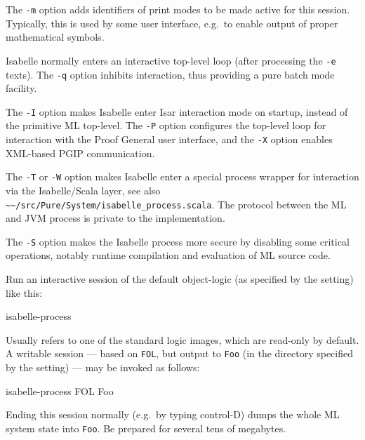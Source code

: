 \begin{isabellebody}
\begin{isamarkuptext}
  \medskip The \verb|-m| option adds identifiers of print modes
  to be made active for this session. Typically, this is used by some
  user interface, e.g.\ to enable output of proper mathematical
  symbols.

  \medskip Isabelle normally enters an interactive top-level loop
  (after processing the \verb|-e| texts). The \verb|-q|
  option inhibits interaction, thus providing a pure batch mode
  facility.

  \medskip The \verb|-I| option makes Isabelle enter Isar
  interaction mode on startup, instead of the primitive ML top-level.
  The \verb|-P| option configures the top-level loop for
  interaction with the Proof General user interface, and the
  \verb|-X| option enables XML-based PGIP communication.

  \medskip The \verb|-T| or \verb|-W| option makes
  Isabelle enter a special process wrapper for interaction via the
  Isabelle/Scala layer, see also \verb|~~/src/Pure/System/isabelle_process.scala|.  The protocol between
  the ML and JVM process is private to the implementation.

  \medskip The \verb|-S| option makes the Isabelle process more
  secure by disabling some critical operations, notably runtime
  compilation and evaluation of ML source code.%
\end{isamarkuptext}%
\isamarkuptrue%
%
\isamarkuptrue%
%
\begin{isamarkuptext}%
Run an interactive session of the default object-logic (as specified
  by the \hyperlink{setting.ISABELLE-LOGIC}{\mbox{}} setting) like this:
\begin{ttbox}
isabelle-process
\end{ttbox}

  Usually \hyperlink{setting.ISABELLE-LOGIC}{\mbox{}} refers to one of the standard
  logic images, which are read-only by default.  A writable session
  --- based on \verb|FOL|, but output to \verb|Foo| (in the
  directory specified by the \hyperlink{setting.ISABELLE-OUTPUT}{\mbox{}} setting) ---
  may be invoked as follows:
\begin{ttbox}
isabelle-process FOL Foo
\end{ttbox}
  Ending this session normally (e.g.\ by typing control-D) dumps the
  whole ML system state into \verb|Foo|. Be prepared for several
  tens of megabytes.


\end{isamarkuptext}
\end{isabellebody}
